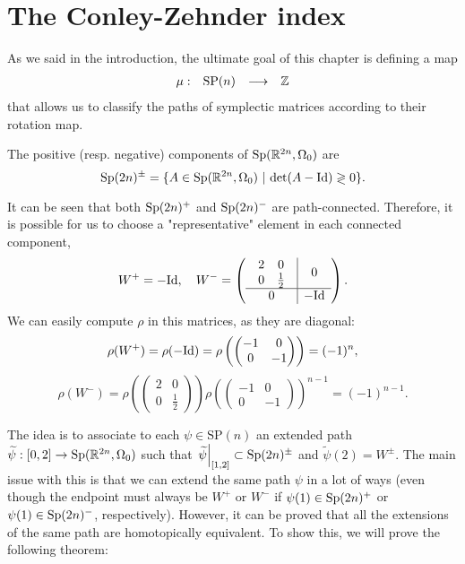 \section{The Conley-Zehnder index}

As we said in the introduction, the ultimate goal of this chapter is defining a map
\[\begin{array}{rccc} \mu : & \text{SP}(n) & \longrightarrow & \mathbb{Z} \end{array}\]
that allows us to classify the paths of symplectic matrices according to their rotation map.

\begin{deff} The positive (resp. negative) components of $\text{Sp}(\mathbb{R}^{2n},\Omega_0)$ are
\[\text{Sp}(2n)^{\pm} = \{A \in \text{Sp}(\mathbb{R}^{2n},\Omega_0) \ | \ \text{det}(A - \text{Id}) \gtrless 0 \} .\]
\end{deff}

It can be seen that both $\text{Sp}(2n)^+$ and $\text{Sp}(2n)^-$ are path-connected. Therefore, it is possible for us to choose a "representative" element in each connected component,
\[W^+ = - \text{Id}, \ \ \ W^- = \left( \begin{array}{c|c} \begin{array}{cc} 2 & 0 \\ 0 & \frac12 \end{array} & 0 \\ \hline 0 & - \text{Id} \end{array} \right) .\]
We can easily compute $\rho$ in this matrices, as they are diagonal:
\[\rho(W^+) = \rho(- \text{Id}) = \rho\left( \begin{pmatrix} -1 & 0 \\ 0 & -1 \end{pmatrix} \right) = (-1)^n ,\]
\[\rho(W^-) = \rho\left( \begin{pmatrix} 2 & 0 \\ 0 & \frac12 \end{pmatrix} \right) \rho\left(\begin{pmatrix}-1&0\\0&-1\end{pmatrix}\right)^{n-1} = (-1)^{n-1} .\]

The idea is to associate to each $\psi \in \text{SP}(n)$ an extended path $\widetilde{\psi} : [0,2] \rightarrow \text{Sp}(\mathbb{R}^{2n},\Omega_0)$ such that $\left. \widetilde{\psi} \right|_{[1,2]} \subset \text{Sp}(2n)^{\pm}$ and $\widetilde{\psi}(2) = W^{\pm}$. The main issue with this is that we can extend the same path $\psi$ in a lot of ways (even though the endpoint must always be $W^+$ or $W^-$ if $\psi(1) \in \text{Sp}(2n)^+$ or $\psi(1) \in \text{Sp}(2n)^-$, respectively). However, it can be proved that all the extensions of the same path are homotopically equivalent. To show this, we will prove the following theorem:

